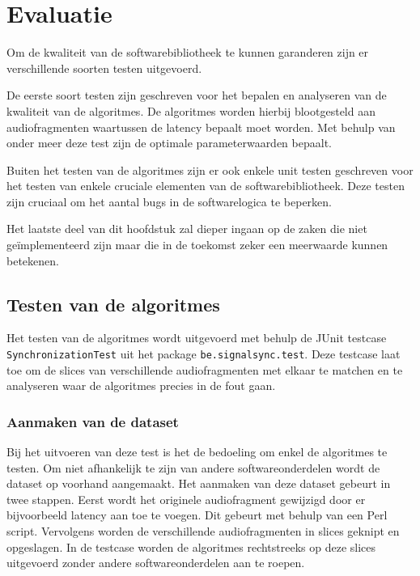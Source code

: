 \chapter{Evaluatie}
\label{evaluatie}

Om de kwaliteit van de softwarebibliotheek te kunnen garanderen zijn er verschillende soorten testen uitgevoerd. 

De eerste soort testen zijn geschreven voor het bepalen en analyseren van de kwaliteit van de algoritmes. De algoritmes worden hierbij blootgesteld aan audiofragmenten waartussen de latency bepaalt moet worden. Met behulp van onder meer deze test zijn de optimale parameterwaarden bepaalt.

Buiten het testen van de algoritmes zijn er ook enkele unit testen geschreven voor het testen van enkele cruciale elementen van de softwarebibliotheek. Deze testen zijn cruciaal om het aantal bugs in de softwarelogica te beperken.

Het laatste deel van dit hoofdstuk zal dieper ingaan op de zaken die niet geïmplementeerd zijn maar die in de toekomst zeker een meerwaarde kunnen betekenen.

\section{Testen van de algoritmes}
\label{algoritme-test}

Het testen van de algoritmes wordt uitgevoerd met behulp de JUnit testcase \texttt{SynchronizationTest} uit het package \texttt{be.signalsync.test}. Deze testcase laat toe om de slices van verschillende audiofragmenten met elkaar te matchen en te analyseren waar de algoritmes precies in de fout gaan.

\subsection{Aanmaken van de dataset}

Bij het uitvoeren van deze test is het de bedoeling om enkel de algoritmes te testen. Om niet afhankelijk te zijn van andere softwareonderdelen wordt de dataset op voorhand aangemaakt. Het aanmaken van deze dataset gebeurt in twee stappen. Eerst wordt het originele audiofragment gewijzigd door er bijvoorbeeld latency aan toe te voegen. Dit gebeurt met behulp van een Perl script. Vervolgens worden de verschillende audiofragmenten in slices geknipt en opgeslagen. In de testcase worden de algoritmes rechtstreeks op deze slices uitgevoerd zonder andere softwareonderdelen aan te roepen.


